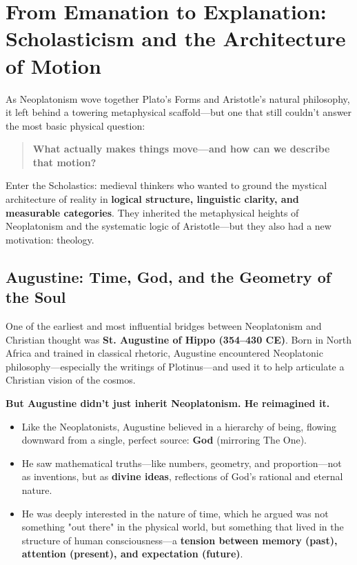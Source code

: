 \section{From Emanation to Explanation: Scholasticism and the Architecture of Motion}

As Neoplatonism wove together Plato’s Forms and Aristotle’s natural philosophy, it left behind a towering metaphysical scaffold—but one that still couldn’t answer the most basic physical question:

\begin{quote}
    \textbf{What actually makes things move—and how can we describe that motion?}
\end{quote}

Enter the Scholastics: medieval thinkers who wanted to ground the mystical architecture of reality in \textbf{logical structure, linguistic clarity, and measurable categories}. They inherited the metaphysical heights of Neoplatonism and the systematic logic of Aristotle—but they also had a new motivation: theology.

\subsection{Augustine: Time, God, and the Geometry of the Soul}

One of the earliest and most influential bridges between Neoplatonism and Christian thought was \textbf{St. Augustine of Hippo (354–430 CE)}. Born in North Africa and trained in classical rhetoric, Augustine encountered Neoplatonic philosophy—especially the writings of Plotinus—and used it to help articulate a Christian vision of the cosmos.

\textbf{But Augustine didn’t just inherit Neoplatonism. He reimagined it.}

\begin{itemize}
    \item Like the Neoplatonists, Augustine believed in a hierarchy of being, flowing downward from a single, perfect source: \textbf{God} (mirroring The One).
    \item He saw mathematical truths—like numbers, geometry, and proportion—not as inventions, but as \textbf{divine ideas}, reflections of God’s rational and eternal nature.
    \item He was deeply interested in the nature of time, which he argued was not something "out there" in the physical world, but something that lived in the structure of human consciousness—a \textbf{tension between memory (past), attention (present), and expectation (future)}.
\end{itemize}

